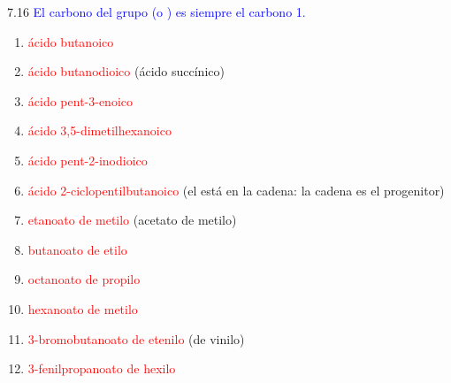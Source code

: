 \begin{Solution}{7.16}
        \textcolor{blue}{El carbono del grupo  (o ) es siempre el carbono 1.}
        \begin{enumerate}[label=\alph*)]
            \item \textcolor{red}{ácido butanoico}
            \item \textcolor{red}{ácido butanodioico} (ácido succínico)
            \item \textcolor{red}{ácido pent-3-enoico}
            \item \textcolor{red}{ácido 3,5-dimetilhexanoico}
            \item \textcolor{red}{ácido pent-2-inodioico}
            \item \textcolor{red}{ácido 2-ciclopentilbutanoico} (el  está en la cadena: la cadena es el progenitor)
            \item \textcolor{red}{etanoato de metilo} (acetato de metilo)
            \item \textcolor{red}{butanoato de etilo}
            \item \textcolor{red}{octanoato de propilo}
            \item \textcolor{red}{hexanoato de metilo}
            \item \textcolor{red}{3-bromobutanoato de etenilo} (de vinilo)
            \item \textcolor{red}{3-fenilpropanoato de hexilo}
        \end{enumerate}
    
\end{Solution}
